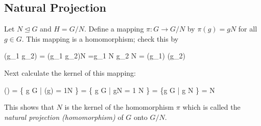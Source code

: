 \subsection{Natural Projection}

Let $N \trianglelefteq G$ and $H = G/N$. Define a mapping $\pi: G \rightarrow G/N$ by $\pi(g) = gN$ for all $g \in G$. This mapping is a homomorphism; check this by

\bee
\pi(g_1 g_2) = (g_1 g_2)N =g_1 N g_2 N = \pi(g_1) \pi(g_2)
\eee

Next calculate the kernel of this mapping:

\bee
{}(\pi) = \{ g \in G | \pi(g) = 1N \} =  \{ g \in G | gN = 1 N \} = \{g \in G | g \in N \} = N
\eee

This shows that $N$ is the kernel of the homomorphism $\pi$ which is called the \emph{natural projection (homomorphism)} of $G$ onto $G/N$.
